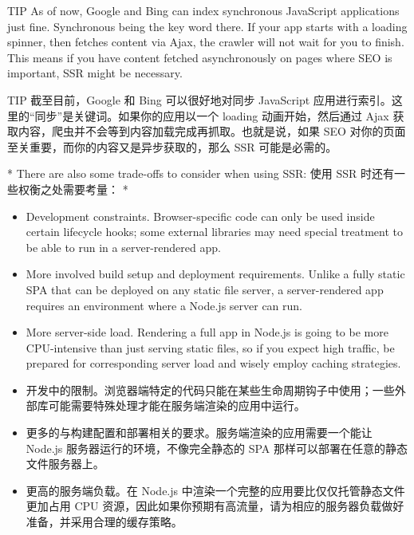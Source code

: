 \begin{paracol}{2}
  \begin{vueQuote}{TIP}
    As of now, Google and Bing can index synchronous JavaScript
    applications just fine. Synchronous being the key word there. If your
    app starts with a loading spinner, then fetches content via Ajax, the
    crawler will not wait for you to finish. This means if you have
    content fetched asynchronously on pages where SEO is important, SSR
    might be necessary.
  \end{vueQuote} 
  \switchcolumn
  \begin{vueQuote}{TIP}
    截至目前，Google 和 Bing 可以很好地对同步 JavaScript
    应用进行索引。这里的``同步''是关键词。如果你的应用以一个 loading
    动画开始，然后通过 Ajax
    获取内容，爬虫并不会等到内容加载完成再抓取。也就是说，如果 SEO
    对你的页面至关重要，而你的内容又是异步获取的，那么 SSR 可能是必需的。
  \end{vueQuote} 
  \switchcolumn[0]*%
  There are also some trade-offs to consider when using SSR:
  \switchcolumn
  使用 SSR 时还有一些权衡之处需要考量：
  \switchcolumn[0]*%
  \begin{itemize}
  \item
    Development constraints. Browser-specific code can only be used inside
    certain lifecycle hooks; some external libraries may need special
    treatment to be able to run in a server-rendered app.
  \item
    More involved build setup and deployment requirements. Unlike a fully
    static SPA that can be deployed on any static file server, a
    server-rendered app requires an environment where a Node.js server can
    run.
  \item
    More server-side load. Rendering a full app in Node.js is going to be
    more CPU-intensive than just serving static files, so if you expect
    high traffic, be prepared for corresponding server load and wisely
    employ caching strategies.
  \end{itemize}
  \switchcolumn
  \begin{itemize}
  \item
    开发中的限制。浏览器端特定的代码只能在某些生命周期钩子中使用；一些外部库可能需要特殊处理才能在服务端渲染的应用中运行。
  \item
    更多的与构建配置和部署相关的要求。服务端渲染的应用需要一个能让 Node.js
    服务器运行的环境，不像完全静态的 SPA
    那样可以部署在任意的静态文件服务器上。
  \item
    更高的服务端负载。在 Node.js
    中渲染一个完整的应用要比仅仅托管静态文件更加占用 CPU
    资源，因此如果你预期有高流量，请为相应的服务器负载做好准备，并采用合理的缓存策略。
\end{itemize}


\end{paracol}

